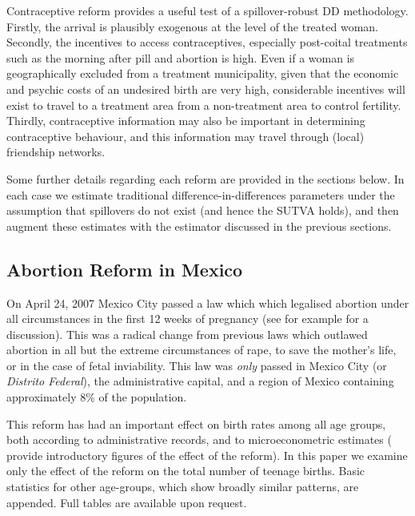 \documentclass{article}
\begin{document}
\begin{spacing}{1.1}
Contraceptive reform provides a useful test of a spillover-robust DD methodology.
Firstly, the arrival is plausibly exogenous at the level of the treated woman.
Secondly, the incentives to access contraceptives, especially post-coital 
treatments such as the morning after pill and abortion is high.  Even if a woman
is geographically excluded from a treatment municipality, given that the economic
and psychic costs of an undesired birth are very high, considerable incentives
will exist to travel to a treatment area from a non-treatment area to control
fertility.  Thirdly, contraceptive information may also be important in
determining contraceptive behaviour, and this information may travel through
(local) friendship networks.

Some further details regarding each reform are provided in the sections below.
In each case we estimate traditional difference-in-differences parameters under
the assumption that spillovers do not exist (and hence the SUTVA holds), and
then augment these estimates with the estimator discussed in the previous
sections.

\subsection{Abortion Reform in Mexico}
On April 24, 2007 Mexico City passed a law which which legalised abortion 
under all circumstances in the first 12 weeks of pregnancy (see for example
\citet{Fraser2014} for a discussion).  This was a radical change from previous 
laws which outlawed abortion in all but the extreme circumstances of rape, 
to save the mother's life, or in the case of fetal inviability.  This law was 
\emph{only} passed in Mexico City (or \emph{Distrito Federal}), the 
administrative capital, and a region of Mexico containing approximately 8\% 
of the population.

This reform has had an important effect on birth rates among all age groups,
both according to administrative records, and to microeconometric estimates
(\citet{ClarkeMuhlrad2014} provide introductory figures of the effect of the
reform).  In this paper we examine only the effect of the reform on the total
number of teenage births.  Basic statistics for other age-groups, which show 
broadly similar patterns, are appended.  Full tables are available upon 
request.


\end{spacing}
\end{document}
